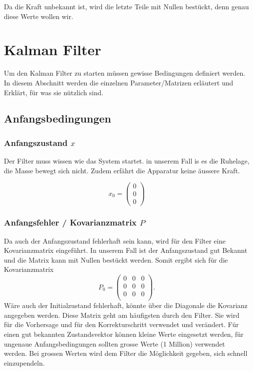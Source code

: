 \documentclass[11pt,a4paper]{article}
\begin{document}
Da die Kraft unbekannt ist, wird die letzte Teile mit Nullen bestückt, denn genau diese Werte wollen wir. 

\section{Kalman Filter}
Um den Kalman Filter zu starten müssen gewisse Bedingungen definiert werden. In diesem Abschnitt werden die einzelnen Parameter/Matrizen erläutert und Erklärt, für was sie nützlich sind. 
\subsection{Anfangsbedingungen}
\subsubsection*{Anfangszustand $x$}
Der Filter muss wissen wie das System startet. in unserem Fall is es die Ruhelage, die Masse bewegt sich nicht. Zudem erfährt die Apparatur keine äussere Kraft. 

\begin{equation}
{x_0 }= \left( \begin{array}{c} 0\\ 0\\ 0\end{array}\right)
\end{equation} 

\subsubsection*{Anfangsfehler / Kovarianzmatrix $P$}
Da auch der Anfangszustand fehlerhaft sein kann, wird für den Filter eine Kovarianzmatrix eingeführt. In unserem Fall ist der Anfangszustand gut Bekannt und die Matrix kann mit Nullen bestückt werden. Somit ergibt sich für die Kovarianzmatrix
\begin{equation}
{P_0 }=
\left(
\begin{array}{ccc} 	
0 & 0 &0 \\ 
0 &0 & 0 \\ 
0 & 0 &0 \\
\end{array}
\right).
\end{equation}
Wäre auch der Initialzustand fehlerhaft, könnte über die Diagonale die Kovarianz angegeben werden.
Diese Matrix geht am häufigsten durch den Filter. Sie wird für die Vorhersage und für den Korrekturschritt verwendet und verändert. Für einen gut bekannten Zustandsvektor können kleine Werte eingesetzt werden, für ungenaue Anfangsbedingungen sollten grosse Werte (1 Million) verwendet werden. Bei grossen Werten wird dem Filter die Möglichkeit gegeben, sich schnell einzupendeln. 
\end{document}

